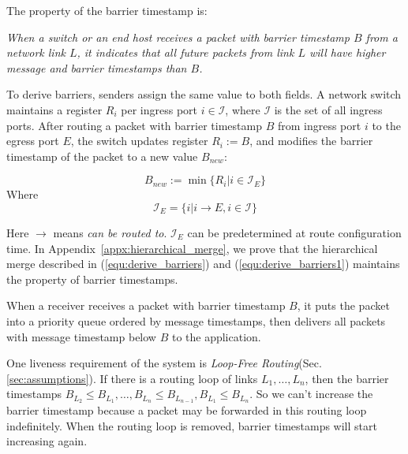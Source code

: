 The property of the barrier timestamp is:

\emph{When a switch or an end host receives a packet with barrier timestamp $B$ from a network link $L$, it indicates that all future packets from link $L$ will have higher message and barrier timestamps than $B$.}

To derive barriers, senders assign the same value to both fields.
A network switch maintains a register $R_i$ per ingress port $i \in \mathcal{I}$, where $\mathcal{I}$ is the set of all ingress ports.
After routing a packet with barrier timestamp $B$ from ingress port $i$ to the egress port $E$, the switch updates register $R_i := B$, and modifies the barrier timestamp of the packet to a new value $B_{new}$:

\begin{equation}\label{equ:derive_barriers}
B_{new}:=\min\{R_i| i\in \mathcal{I}_E\}
\end{equation}
Where 
\begin{equation}\label{equ:derive_barriers1}
\mathcal{I}_E =\{i| i\rightarrow E, i \in \mathcal{I} \}
\end{equation}

Here $\rightarrow$ means \textit{can be routed to}.
$\mathcal{I}_E$ can be predetermined at route configuration time.
In Appendix~\ref{appx:hierarchical_merge}, we prove that the hierarchical merge described in (\ref{equ:derive_barriers}) and (\ref{equ:derive_barriers1}) maintains the property of barrier timestamps.

When a receiver receives a packet with barrier timestamp $B$, it puts the packet into a priority queue ordered by message timestamps, then delivers all packets with message timestamp below $B$ to the application.

One liveness requirement of the system is \textit{Loop-Free Routing}(Sec.\ref{sec:assumptions}).
If there is a routing loop of links $L_1, \ldots , L_n$, then the barrier timestamps $B_{L_2} \leq B_{L_1}, \ldots, B_{L_n} \leq B_{L_{n-1}}, B_{L_1} \leq B_{L_n}$. So we can't increase the barrier timestamp because a packet may be forwarded in this routing loop indefinitely.
When the routing loop is removed, barrier timestamps will start increasing again.

